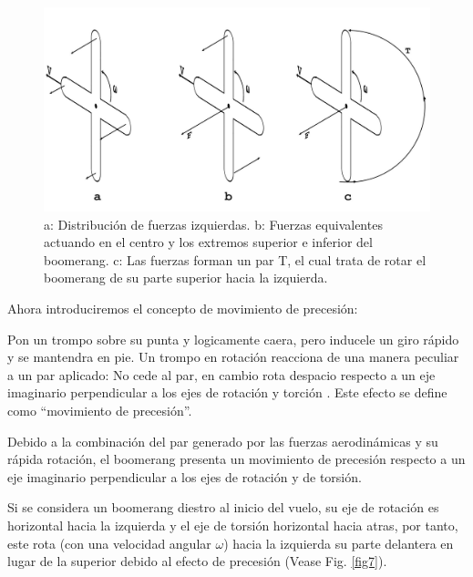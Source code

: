 		\begin{figure}[ht]
		\begin{center}
		\includegraphics[scale=0.15]{imagenes/3-boomerang/DistrutionOfLEftwardForces.png}
		\caption{a: Distribución de fuerzas izquierdas. b: Fuerzas equivalentes actuando en el centro y los extremos superior e inferior del boomerang. c: Las fuerzas forman un par T, el cual trata de rotar el boomerang de su parte superior hacia la izquierda.}
		\label{fig6}
		\end{center}
		\end{figure}
\newpage
	Ahora introduciremos el concepto de movimiento de precesión:

	Pon un trompo sobre su punta y logicamente caera, pero inducele un giro rápido y se mantendra en pie. Un trompo en rotación reacciona de una manera peculiar a un par aplicado: No cede al par, en cambio rota despacio respecto a un eje imaginario perpendicular a los ejes de rotación y torción \cite{Hess1975}. Este efecto se define como ``movimiento de precesión''.

	Debido a la combinación del par generado por las fuerzas aerodinámicas y su rápida rotación, el boomerang presenta un movimiento de precesión respecto a un eje imaginario perpendicular a los ejes de rotación y de torsión.

	Si se considera un boomerang diestro al inicio del vuelo, su eje de rotación es horizontal hacia la izquierda y el eje de torsión horizontal hacia atras, por tanto, este rota (con una velocidad angular $\omega$) hacia la izquierda su parte delantera en lugar de la superior debido al efecto de precesión (Vease Fig. \ref{fig7}).

